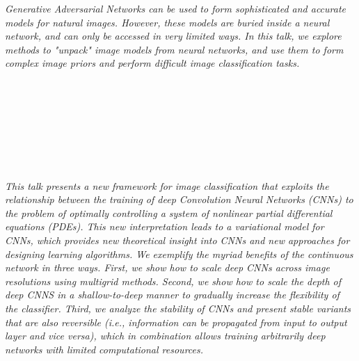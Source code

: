 \begin{multicols}{2}
        \\
        \\\\
        \\
        \\\\
        \\
        \\\\
\\
      \textit{Generative Adversarial Networks can be used to form sophisticated and accurate models for natural images. However, these models are buried inside a neural network, and can only be accessed in very limited ways.  In this talk, we explore methods to "unpack" image models from neural networks, and use them to form complex image priors and perform difficult image classification tasks. }\\
\\ 
        \\
        \\\\
        \\
        \\\\
\\
      \textit{This talk presents a new framework for image classification that exploits the relationship between the training of deep Convolution Neural Networks (CNNs) to the problem of optimally controlling a system of nonlinear partial differential equations (PDEs). This new interpretation leads to a variational model for CNNs, which provides new theoretical insight into CNNs and new approaches for designing learning algorithms. We exemplify the myriad benefits of the continuous network in three ways. First, we show how to scale deep CNNs across image resolutions using multigrid methods. Second, we show how to scale the depth of deep CNNS in a shallow-to-deep manner to gradually increase the flexibility of the classifier. Third, we analyze the stability of CNNs and present stable variants that are also reversible (i.e., information can be propagated from input to output layer and vice versa), which in combination allows training arbitrarily deep networks with limited computational resources.}\\
\\ 

\end{multicols}
